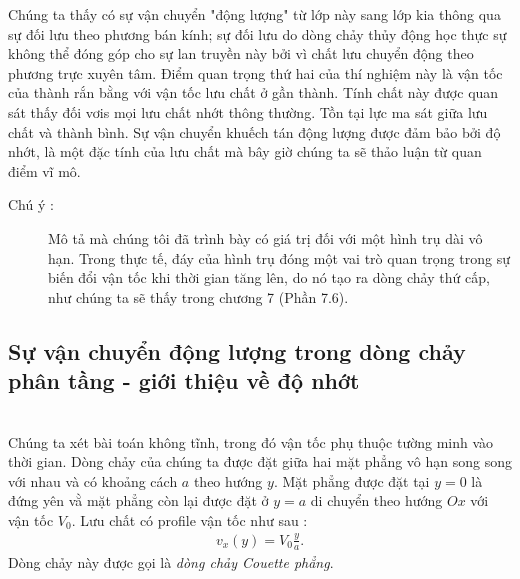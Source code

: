 \documentclass[THUY_DONG_HOC.tex]{subfiles}
\begin{document}
Chúng ta thấy có sự vận chuyển "động lượng" từ lớp này sang lớp kia thông qua sự đối lưu theo phương bán kính; sự đối lưu do dòng chảy thủy động học thực sự không thể đóng góp cho sự lan truyền này bởi vì chất lưu chuyển động theo phương trực xuyên tâm. Điểm quan trọng thứ hai của thí nghiệm này là vận tốc của thành rắn bằng với vận tốc lưu chất ở gần thành. Tính chất này được quan sát thấy đối vơis mọi lưu chất nhớt thông thường. Tồn tại lực ma sát giữa lưu chất và thành bình. Sự vận chuyển khuếch tán động lượng được đảm bảo bởi độ nhớt, là một đặc tính của lưu chất mà bây giờ chúng ta sẽ thảo luận từ quan điểm vĩ mô.
\begin{description}
		\item[Chú ý :] Mô tả mà chúng tôi đã trình bày có giá trị đối với một hình trụ dài vô hạn. Trong thực tế, đáy của hình trụ đóng một vai trò quan trọng trong sự biến đổi vận tốc khi thời gian tăng lên, do nó tạo ra dòng chảy thứ cấp, như chúng ta sẽ thấy trong chương 7 (Phần 7.6).
\end{description}
\subsection{Sự vận chuyển động lượng trong dòng chảy phân tầng - giới thiệu về độ nhớt}
\\

Chúng ta xét bài toán không tĩnh, trong đó vận tốc phụ thuộc tường minh vào thời gian. Dòng chảy của chúng ta được đặt giữa hai mặt phẳng vô hạn song song với nhau và có khoảng cách $a$ theo hướng $y$. Mặt phẳng được đặt tại $y=0$ là đứng yên vằ mặt phẳng còn lại được đặt ở $y=a$ di chuyển theo hướng $Ox$ với vận tốc $V_0$. Lưu chất có profile vận tốc như sau :
\begin{equation}
	\begin{aligned}
		v_x(y)=V_0\frac{y}{a}.
	\end{aligned}
\end{equation}
Dòng chảy này được gọi là \emph{dòng chảy Couette phẳng}. 
\end{document}
